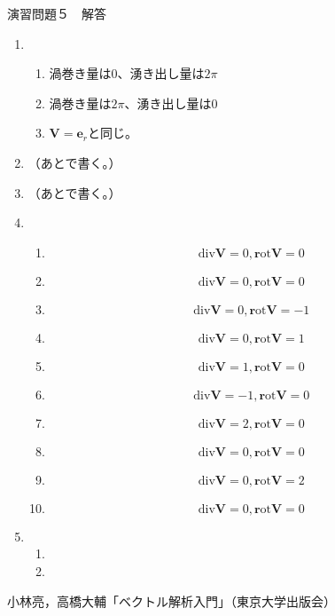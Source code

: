 \documentclass{jarticle}
\def\rot{\mathrm{\bm rot}}
\def\div{\mathrm{div}}
\begin{document}
\begin{center} {\Large 演習問題５　解答} \end{center}
  \begin{enumerate}
    \item
      \begin{enumerate}
        \item
          渦巻き量は$0$、湧き出し量は$2\pi$
        \item
          渦巻き量は$2\pi$、湧き出し量は$0$
        \item
          $\bm V = \bm e_r$と同じ。
      \end{enumerate}
    \item
      （あとで書く。）
    \item
      （あとで書く。）
    \item
      \begin{enumerate}
        \item 
          \[ \div \bm V = 0, \rot \bm V = 0 \]
        \item
          \[ \div \bm V = 0, \rot \bm V = 0 \]
        
        \item
          \[ \div \bm V = 0, \rot \bm V = -1 \]
        \item
          \[ \div \bm V = 0, \rot \bm V = 1 \]
        \item 
          \[ \div \bm V = 1, \rot \bm V = 0 \]
        \item
          \[ \div \bm V = -1, \rot \bm V = 0 \]
        
        \item
          \[ \div \bm V = 2, \rot \bm V = 0 \]
        \item
          \[ \div \bm V = 0, \rot \bm V = 0 \]
      
        \item
          \[ \div \bm V = 0, \rot \bm V = 2 \]
        \item
          \[ \div \bm V = 0, \rot \bm V = 0 \]
      \end{enumerate}
    \item
      \begin{enumerate}
        \item
          
        \item
          
      \end{enumerate}
  \end{enumerate}
  

\newpage

\begin{thebibliography}{99}
 小林亮，高橋大輔「ベクトル解析入門」（東京大学出版会）
\end{thebibliography}
\end{document}
